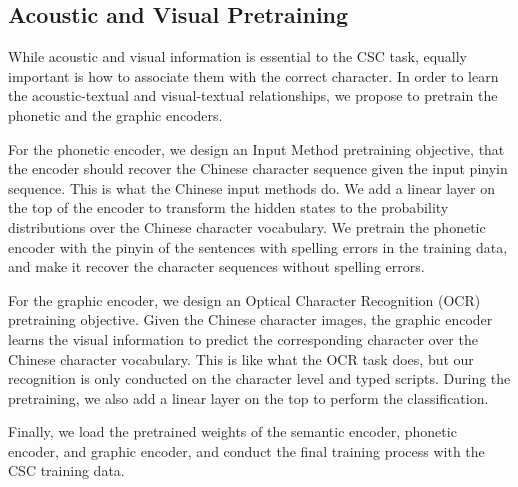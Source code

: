 \documentclass[11pt,a4paper]{article}
\begin{document}
\subsection{Acoustic and Visual Pretraining}
While acoustic and visual information is essential to the CSC task, equally important is how to associate them with the correct character.
In order to learn the acoustic-textual and visual-textual relationships, we propose to pretrain the phonetic and the graphic encoders. 

For the phonetic encoder, we design an Input Method pretraining objective, that the encoder should recover the Chinese character sequence given the input pinyin sequence. This is what the Chinese input methods do. 
We add a linear layer on the top of the encoder to transform the hidden states to the probability distributions over the Chinese character vocabulary. 
We pretrain the phonetic encoder with the pinyin of the sentences with spelling errors in the training data, and make it recover the character sequences without spelling errors. 


For the graphic encoder, we design an Optical Character Recognition (OCR) pretraining objective.
Given the Chinese character images, the graphic encoder learns the visual information to predict the corresponding character over the Chinese character vocabulary.
This is like what the OCR task does, but our recognition is only conducted on the character level and typed scripts. During the pretraining, we also add a linear layer on the top to perform the classification. 


Finally, we load the pretrained weights of the semantic encoder, phonetic encoder, and graphic encoder, and conduct the final training process with the CSC training data.
\end{document}
